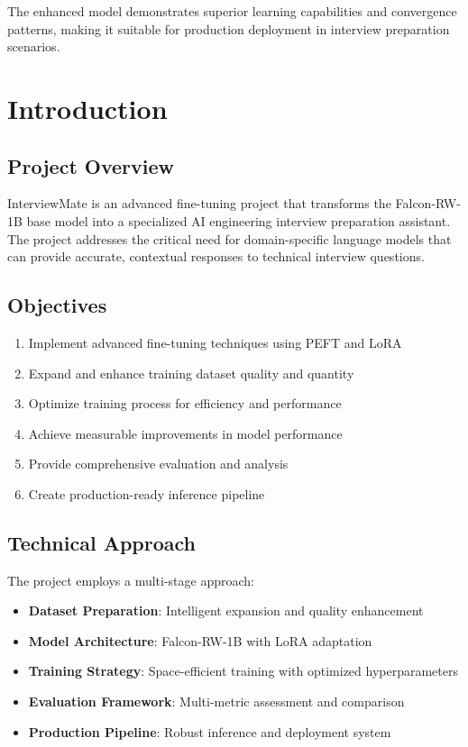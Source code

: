\documentclass[12pt,a4paper]{article}
\begin{document}
The enhanced model demonstrates superior learning capabilities and convergence patterns, making it suitable for production deployment in interview preparation scenarios.

\section{Introduction}

\subsection{Project Overview}
InterviewMate is an advanced fine-tuning project that transforms the Falcon-RW-1B base model into a specialized AI engineering interview preparation assistant. The project addresses the critical need for domain-specific language models that can provide accurate, contextual responses to technical interview questions.

\subsection{Objectives}
\begin{enumerate}
    \item Implement advanced fine-tuning techniques using PEFT and LoRA
    \item Expand and enhance training dataset quality and quantity
    \item Optimize training process for efficiency and performance
    \item Achieve measurable improvements in model performance
    \item Provide comprehensive evaluation and analysis
    \item Create production-ready inference pipeline
\end{enumerate}

\subsection{Technical Approach}
The project employs a multi-stage approach:
\begin{itemize}
    \item \textbf{Dataset Preparation}: Intelligent expansion and quality enhancement
    \item \textbf{Model Architecture}: Falcon-RW-1B with LoRA adaptation
    \item \textbf{Training Strategy}: Space-efficient training with optimized hyperparameters
    \item \textbf{Evaluation Framework}: Multi-metric assessment and comparison
    \item \textbf{Production Pipeline}: Robust inference and deployment system
\end{itemize}
\end{document}

